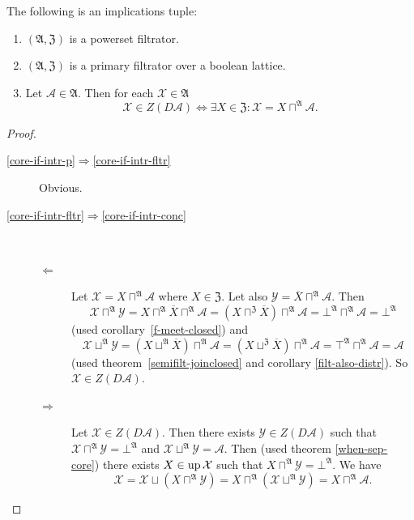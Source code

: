 \begin{thm}
\label{core-if-intr}The following is an implications tuple:
\begin{enumerate}
\item \label{core-if-intr-p}$(\mathfrak{A},\mathfrak{Z})$ is a powerset
filtrator.
\item \label{core-if-intr-fltr}$(\mathfrak{A},\mathfrak{Z})$ is a primary
filtrator over a boolean lattice.
\item \label{core-if-intr-conc}Let $\mathcal{A}\in\mathfrak{A}$. Then
for each $\mathcal{X}\in\mathfrak{A}$
\[
\mathcal{X}\in Z(D\mathcal{A})\Leftrightarrow\exists X\in\mathfrak{Z}:\mathcal{X}=X\sqcap^{\mathfrak{A}}\mathcal{A}.
\]

\end{enumerate}
\end{thm}
\begin{proof}
~
\begin{description}
\item [{\ref{core-if-intr-p}$\Rightarrow$\ref{core-if-intr-fltr}}] Obvious.
\item [{\ref{core-if-intr-fltr}$\Rightarrow$\ref{core-if-intr-conc}}] ~

\begin{description}
\item [{$\Leftarrow$}] Let $\mathcal{X}=X\sqcap^{\mathfrak{A}}\mathcal{A}$
where $X\in\mathfrak{Z}$. Let also $\mathcal{Y}=\overline{X}\sqcap^{\mathfrak{A}}\mathcal{A}$.
Then \[\mathcal{X}\sqcap^{\mathfrak{A}}\mathcal{Y}=X\sqcap^{\mathfrak{A}}\overline{X}\sqcap^{\mathfrak{A}}\mathcal{A}=(X\sqcap^{\mathfrak{Z}}\overline{X})\sqcap^{\mathfrak{A}}\mathcal{A}=\bot^{\mathfrak{A}}\sqcap^{\mathfrak{A}}\mathcal{A}=\bot^{\mathfrak{A}}\]
(used corollary~\ref{f-meet-closed}) and \[\mathcal{X}\sqcup^{\mathfrak{A}}\mathcal{Y}=(X\sqcup^{\mathfrak{A}}\overline{X})\sqcap^{\mathfrak{A}}\mathcal{A}=(X\sqcup^{\mathfrak{Z}}\overline{X})\sqcap^{\mathfrak{A}}\mathcal{A}=\top^{\mathfrak{A}}\sqcap^{\mathfrak{A}}\mathcal{A}=\mathcal{A}\]
(used theorem~\ref{semifilt-joinclosed} and corollary \ref{filt-also-distr}).
So $\mathcal{X}\in Z(D\mathcal{A})$.
\item [{$\Rightarrow$}] Let $\mathcal{X}\in Z(D\mathcal{A})$. Then there
exists $\mathcal{Y}\in Z(D\mathcal{A})$ such that $\mathcal{X}\sqcap^{\mathfrak{A}}\mathcal{Y}=\bot^{\mathfrak{A}}$
and $\mathcal{X}\sqcup^{\mathfrak{A}}\mathcal{Y}=\mathcal{A}$. Then
(used theorem \ref{when-sep-core}) there exists $X\in\operatorname{up}\mathcal{X}$
such that $X\sqcap^{\mathfrak{A}}\mathcal{Y}=\bot^{\mathfrak{A}}$.
We have
\[
\mathcal{X}=\mathcal{X}\sqcup(X\sqcap^{\mathfrak{A}}\mathcal{Y})=X\sqcap^{\mathfrak{A}}(\mathcal{X}\sqcup^{\mathfrak{A}}\mathcal{Y})=X\sqcap^{\mathfrak{A}}\mathcal{A}.
\]

\end{description}
\end{description}
\end{proof}

